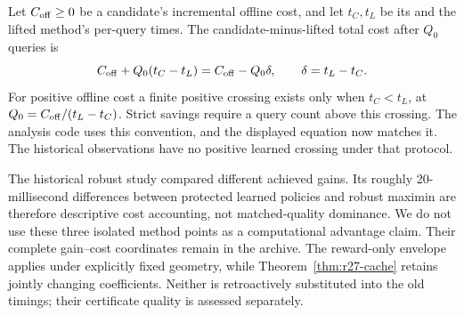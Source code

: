 \documentclass[11pt,letterpaper]{article}
\theoremstyle{definition}\newtheorem{assumption}[theorem]{Assumption}
\begin{document}
Let $C_{\rm off}\geq0$ be a candidate's incremental offline cost, and let $t_C,t_L$ be its and the lifted method's per-query times. The candidate-minus-lifted total cost after $Q_0$ queries is
\begin{equation}\label{eq:amortization}
 C_{\rm off}+Q_0(t_C-t_L)=C_{\rm off}-Q_0\delta,
 \qquad \delta=t_L-t_C.
\end{equation}
For positive offline cost a finite positive crossing exists only when $t_C<t_L$, at $Q_0=C_{\rm off}/(t_L-t_C)$. Strict savings require a query count above this crossing. The analysis code uses this convention, and the displayed equation now matches it. The historical observations have no positive learned crossing under that protocol.


The historical robust study compared different achieved gains. Its roughly 20-millisecond differences between protected learned policies and robust maximin are therefore descriptive cost accounting, not matched-quality dominance. We do not use these three isolated method points as a computational advantage claim. Their complete gain--cost coordinates remain in the archive. The reward-only envelope applies under explicitly fixed geometry, while Theorem~\ref{thm:r27-cache} retains jointly changing coefficients. Neither is retroactively substituted into the old timings; their certificate quality is assessed separately.



\end{document}
